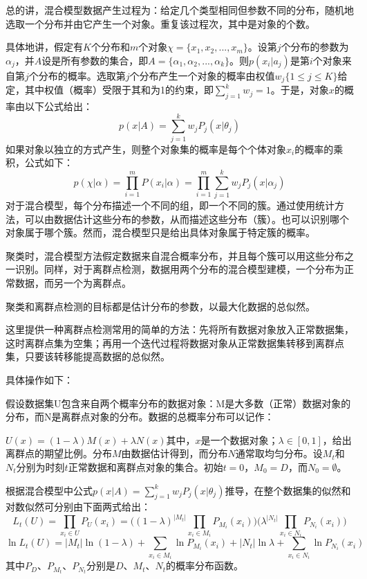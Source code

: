总的讲，混合模型数据产生过程为：给定几个类型相同但参数不同的分布，随机地选取一个分布并由它产生一个对象。重复该过程次，其中是对象的个数。

具体地讲，假定有$K$个分布和$m$个对象$\chi=\{x_1,x_2,...,x_m\}$。设第$ j$个分布的参数为$\alpha_j$，并$A$设是所有参数的集合，即$A=\{\alpha_1,\alpha_2,...,\alpha_k\}$。则$p(x_i|a_j)$是第$i$个对象来自第$j$个分布的概率。选取第$j$个分布产生一个对象的概率由权值$w_j\{1\le j\le K\}$给定，其中权值（概率）受限于其和为1的约束，即$\sum_{j=1}^k w_j=1$。于是，对象$x$的概率由以下公式给出：
\begin{equation}p(x|A)=\sum_{j=1}^k w_jP_j(x|\theta_j)\end{equation}
如果对象以独立的方式产生，则整个对象集的概率是每个个体对象$x_i$的概率的乘积，公式如下：
\begin{equation}p(\chi|\alpha)=\prod_{i=1}^m P(x_i|\alpha)=\prod_{i=1}^m\sum_{j=1}^k w_jP_j(x|\alpha_j)\end{equation}
对于混合模型，每个分布描述一个不同的组，即一个不同的簇。通过使用统计方法，可以由数据估计这些分布的参数，从而描述这些分布（簇）。也可以识别哪个对象属于哪个簇。然而，混合模型只是给出具体对象属于特定簇的概率。

聚类时，混合模型方法假定数据来自混合概率分布，并且每个簇可以用这些分布之一识别。同样，对于离群点检测，数据用两个分布的混合模型建模，一个分布为正常数据，而另一个为离群点。

聚类和离群点检测的目标都是估计分布的参数，以最大化数据的总似然。

这里提供一种离群点检测常用的简单的方法：先将所有数据对象放入正常数据集，这时离群点集为空集；再用一个迭代过程将数据对象从正常数据集转移到离群点集，只要该转移能提高数据的总似然。

具体操作如下：

假设数据集U包含来自两个概率分布的数据对象：M是大多数（正常）数据对象的分布，而N是离群点对象的分布。数据的总概率分布可以记作：

 $U(x)=(1-\lambda)M(x)+\lambda N(x)$其中，$x$是一个数据对象；$\lambda\in[0,1]$，给出离群点的期望比例。分布$M$由数据估计得到，而分布$N$通常取均匀分布。设$M_t$和$N_t$分别为时刻$t$正常数据和离群点对象的集合。初始$t=0$，$M_0=D$，而$N_0=\emptyset$。

根据混合模型中公式$p(x|A)=\sum_{j=1}^k w_jP_j(x|\theta_j)$推导，在整个数据集的似然和对数似然可分别由下面两式给出：
\begin{equation} 
L_t(U)=\prod_{x_i\in U } P_U(x_i)=\bigg ((1-\lambda)^{|M_t|} \prod_{x_i\in M_i} P_{M_i}(x_i) \bigg)\bigg(\lambda^{|N_t|} \prod_{x_i\in N_i}P_{N_i}(x_i)\bigg) 
\end{equation}
\begin{equation}
\ln L_t(U)=|M_t|\ln (1-\lambda)+\sum_{x_i \in M_i }\ln P_{M_i}(x_i)+|N_t|\ln \lambda +\sum_{x_i \in N_i }\ln P_{N_i}(x_i)
\end{equation}
其中$P_D$、$P_{M_t}$、$P_{N_t}$分别是$D$、$M_t$、$N_t$的概率分布函数。

